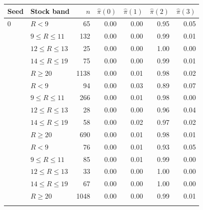 \begin{tabular}{llrrrrr}
\toprule
Seed & Stock band & $n$ & $\hat\pi(0)$ & $\hat\pi(1)$ & $\hat\pi(2)$ & $\hat\pi(3)$ \\
\midrule
0 & $R<9$ & 65 & 0.00 & 0.00 & 0.95 & 0.05 \\
 & $9\le R\le 11$ & 132 & 0.00 & 0.00 & 0.99 & 0.01 \\
 & $12\le R\le 13$ & 25 & 0.00 & 0.00 & 1.00 & 0.00 \\
 & $14\le R\le 19$ & 75 & 0.00 & 0.00 & 0.99 & 0.01 \\
 & $R\ge 20$ & 1138 & 0.00 & 0.01 & 0.98 & 0.02 \\
\addlinespace
1 & $R<9$ & 94 & 0.00 & 0.03 & 0.89 & 0.07 \\
 & $9\le R\le 11$ & 266 & 0.00 & 0.01 & 0.98 & 0.00 \\
 & $12\le R\le 13$ & 28 & 0.00 & 0.00 & 0.96 & 0.04 \\
 & $14\le R\le 19$ & 58 & 0.00 & 0.02 & 0.97 & 0.02 \\
 & $R\ge 20$ & 690 & 0.00 & 0.01 & 0.98 & 0.01 \\
\addlinespace
2 & $R<9$ & 76 & 0.00 & 0.01 & 0.93 & 0.05 \\
 & $9\le R\le 11$ & 85 & 0.00 & 0.01 & 0.99 & 0.00 \\
 & $12\le R\le 13$ & 33 & 0.00 & 0.00 & 1.00 & 0.00 \\
 & $14\le R\le 19$ & 67 & 0.00 & 0.00 & 1.00 & 0.00 \\
 & $R\ge 20$ & 1048 & 0.00 & 0.00 & 0.99 & 0.01 \\
\addlinespace
\bottomrule
\end{tabular}
